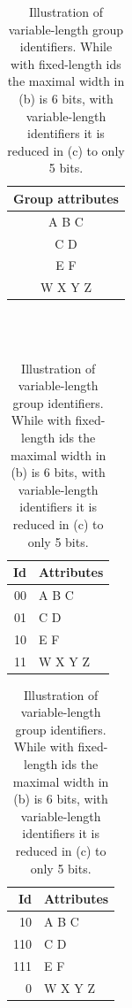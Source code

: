 \begin{table}[t!]
\small

\centering
\begin{subtable}[t]{0.35\linewidth}
\caption{Groups}\label{Table_variable_a}
\begin{tabular}{|c|}
\hline
\textbf{Group attributes}\\
\hline
A B C\\
C D\\
E F\\
W X Y Z\\
\hline
\end{tabular}
\end{subtable}\\~\\


\begin{subtable}[t]{0.49\linewidth}
\begin{center}
\caption{Fixed-length group ids}\label{Table_variable_b}
\begin{tabular}{|r|l|}
\hline
\textbf{Id}   &  \textbf{Attributes}\\
\hline
00 & A B C\\
01 &  C D\\
10 &  E F\\
11 &  W X Y Z\\ \hline 
\end{tabular}
\end{center}
\end{subtable}
\hfill
\begin{subtable}[t]{0.49\linewidth}
\begin{center}
\caption{Variable-length group ids}\label{Table_variable_c}
\begin{tabular}{|r|l|}
\hline
\textbf{Id}   &  \textbf{Attributes}\\
\hline
10 & A B C\\
110 &  C D\\
111 &  E F\\
0 &  W X Y Z\\
\hline
\end{tabular}
\end{center}
\end{subtable}

\caption{Illustration of variable-length group identifiers. While with fixed-length ids the maximal width in (b) is 6 bits, with variable-length identifiers it is reduced in (c) to only 5 bits.
}\label{Table_variable}
\end{table}



